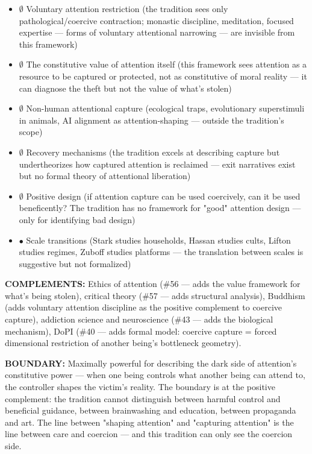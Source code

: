 \begin{itemize}[nosep,leftmargin=*]
  \item $\emptyset$ Voluntary attention restriction (the tradition sees only pathological/coercive contraction; monastic discipline, meditation, focused expertise — forms of voluntary attentional narrowing — are invisible from this framework)
  \item $\emptyset$ The constitutive value of attention itself (this framework sees attention as a resource to be captured or protected, not as constitutive of moral reality — it can diagnose the theft but not the value of what's stolen)
  \item $\emptyset$ Non-human attentional capture (ecological traps, evolutionary superstimuli in animals, AI alignment as attention-shaping — outside the tradition's scope)
  \item $\emptyset$ Recovery mechanisms (the tradition excels at describing capture but undertheorizes how captured attention is reclaimed — exit narratives exist but no formal theory of attentional liberation)
  \item $\emptyset$ Positive design (if attention capture can be used coercively, can it be used beneficently? The tradition has no framework for "good" attention design — only for identifying bad design)
  \item $\bullet$ Scale transitions (Stark studies households, Hassan studies cults, Lifton studies regimes, Zuboff studies platforms — the translation between scales is suggestive but not formalized)
\end{itemize}


\textbf{COMPLEMENTS:} Ethics of attention (\#56 — adds the value framework for what's being stolen), critical theory (\#57 — adds structural analysis), Buddhism (adds voluntary attention discipline as the positive complement to coercive capture), addiction science and neuroscience (\#43 — adds the biological mechanism), DoPI (\#40 — adds formal model: coercive capture = forced dimensional restriction of another being's bottleneck geometry).


\textbf{BOUNDARY:} Maximally powerful for describing the dark side of attention's constitutive power — when one being controls what another being can attend to, the controller shapes the victim's reality. The boundary is at the positive complement: the tradition cannot distinguish between harmful control and beneficial guidance, between brainwashing and education, between propaganda and art. The line between "shaping attention" and "capturing attention" is the line between care and coercion — and this tradition can only see the coercion side.



